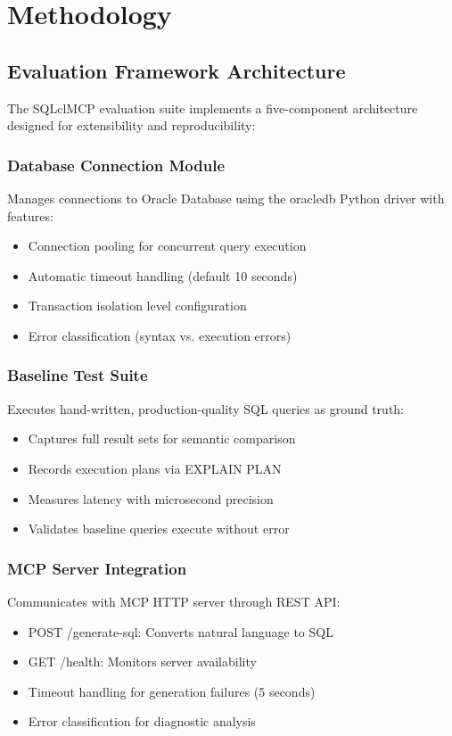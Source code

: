 \section{Methodology}
\label{sec:methodology}

\subsection{Evaluation Framework Architecture}

The SQLclMCP evaluation suite implements a five-component architecture designed for extensibility and reproducibility:

\subsubsection{Database Connection Module}
Manages connections to Oracle Database using the oracledb Python driver with features:
\begin{itemize}
    \item Connection pooling for concurrent query execution
    \item Automatic timeout handling (default 10 seconds)
    \item Transaction isolation level configuration
    \item Error classification (syntax vs. execution errors)
\end{itemize}

\subsubsection{Baseline Test Suite}
Executes hand-written, production-quality SQL queries as ground truth:
\begin{itemize}
    \item Captures full result sets for semantic comparison
    \item Records execution plans via EXPLAIN PLAN
    \item Measures latency with microsecond precision
    \item Validates baseline queries execute without error
\end{itemize}

\subsubsection{MCP Server Integration}
Communicates with MCP HTTP server through REST API:
\begin{itemize}
    \item POST /generate-sql: Converts natural language to SQL
    \item GET /health: Monitors server availability
    \item Timeout handling for generation failures (5 seconds)
    \item Error classification for diagnostic analysis
\end{itemize}

